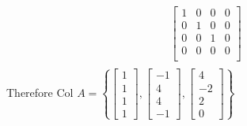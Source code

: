 \documentclass[12pt letter]{report}
\begin{document}
{\begin{align*}
\begin{bmatrix}
      1 & 0 & 0 & 0 \\
      0 & 1 & 0 & 0 \\
      0 & 0 & 1 & 0 \\
      0 & 0 & 0 & 0 \\
    \end{bmatrix}
    \\
  \end{align*}
  Therefore $\text{Col }A = \left\{ \begin{bmatrix} 1 \\ 1\\ 1\\ 1 \end{bmatrix}, \begin{bmatrix} -1 \\ 4\\ 4\\ -1
    \end{bmatrix}, \begin{bmatrix} 4 \\ -2\\ 2\\ 0 \end{bmatrix}    \right\} $ \\

}
\end{document}
